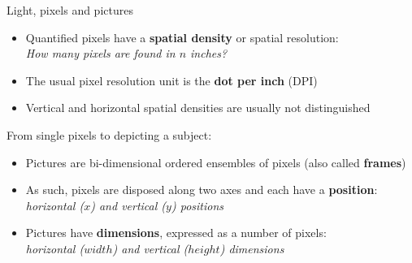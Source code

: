 \begin{frame}{Light, pixels and pictures}
  \begin{itemize}
  \item Quantified pixels have a \textbf{spatial density} or spatial resolution:\\
  \textit{How many pixels are found in \(n\) inches?}
  \item The usual pixel resolution unit is the \textbf{dot per inch} (DPI)
  \item Vertical and horizontal spatial densities are usually not distinguished
  \end{itemize}

  \begin{center}
  From single pixels to depicting a subject:
  \end{center}

  \begin{itemize}
  \item Pictures are bi-dimensional ordered ensembles of pixels (also called \textbf{frames})
  \item As such, pixels are disposed along two axes and each have a \textbf{position}:\\
   \textit{horizontal (\(x\)) and vertical (\(y\)) positions}
  \item Pictures have \textbf{dimensions}, expressed as a number of pixels:\\
   \textit{horizontal (\(width\)) and vertical (\(height\)) dimensions}
  \end{itemize}

\end{frame}

